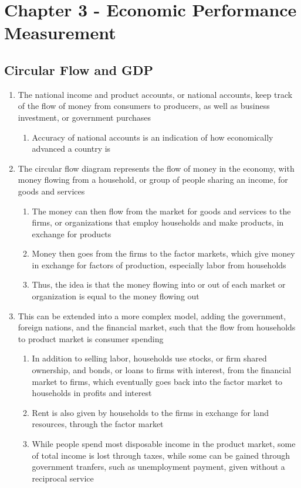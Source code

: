 \documentclass[11 pt, twoside]{article}
\begin{document}
\section{Chapter 3 - Economic Performance Measurement}
\subsection{Circular Flow and GDP}
\begin{enumerate}
\item The national income and product accounts, or national accounts, keep track of the flow of money from consumers to producers, as well as business investment, or government purchases
\begin{enumerate}
\item Accuracy of national accounts is an indication of how economically advanced a country is
\end{enumerate}
\item The circular flow diagram represents the flow of money in the economy, with money flowing from a household, or group of people sharing an income, for goods and services
\begin{enumerate}
\item The money can then flow from the market for goods and services to the firms, or organizations that employ households and make products, in exchange for products
\item Money then goes from the firms to the factor markets, which give money in exchange for factors of production, especially labor from households
\item Thus, the idea is that the money flowing into or out of each market or organization is equal to the money flowing out
\end{enumerate}
\item This can be extended into a more complex model, adding the government, foreign nations, and the financial market, such that the flow from households to product market is consumer spending
\begin{enumerate}
\item In addition to selling labor, households use stocks, or firm shared ownership, and bonds, or loans to firms with interest, from the financial market to firms, which eventually goes back into the factor market to households in profits and interest
\item Rent is also given by households to the firms in exchange for land resources, through the factor market
\item While people spend most disposable income in the product market, some of total income is lost through taxes, while some can be gained through government tranfers, such as unemployment payment, given without a reciprocal service

\end{enumerate}
\end{enumerate}
\end{document}
